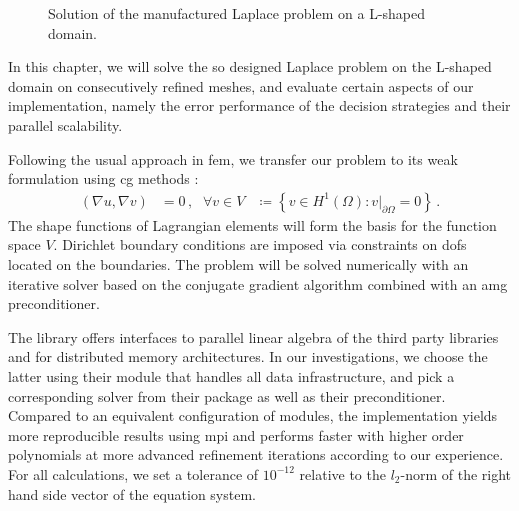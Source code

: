 \begin{figure}
\centering
%
\caption{Solution of the manufactured Laplace problem on a L-shaped domain.}
\label{fig:solution}
\end{figure}

In this chapter, we will solve the so designed Laplace problem on the L-shaped domain on consecutively refined meshes, and evaluate certain aspects of our implementation, namely the error performance of the decision strategies and their parallel scalability.

Following the usual approach in \gls{fem}, we transfer our problem to its weak formulation using \gls{cg} methods \parencite{brenner2008}:
\begin{align}
\left(\nabla u, \nabla v\right) &= 0 \,\text{,} & \forall v \in V &\coloneqq \left\{ v \in H^1(\Omega): v|_{\partial\Omega} = 0 \right\} \,\text{.}
\end{align}
The shape functions of Lagrangian elements will form the basis for the function space $V$. Dirichlet boundary conditions are imposed via constraints on \glspl{dof} located on the boundaries. The problem will be solved numerically with an iterative solver based on the conjugate gradient algorithm combined with an \gls{amg} preconditioner.

The \dealii{} library offers interfaces to parallel linear algebra of the third party libraries \petsc{} \textcite{petsc3124} and \trilinos{} \textcite{trilinos12181} for distributed memory architectures. In our investigations, we choose the latter using their \epetra{}
module that handles all data infrastructure, and pick a corresponding solver from their \aztecoo{}
package as well as their \ml{}
preconditioner. Compared to an equivalent configuration of \petsc{} modules, the \trilinos{} implementation yields more reproducible results using \gls{mpi} \parencite[FAQ]{petsc3124} and performs faster with higher order polynomials at more advanced refinement iterations according to our experience. For all calculations, we set a tolerance of $10^{-12}$ relative to the $l_2$-norm of the right hand side vector of the equation system.





